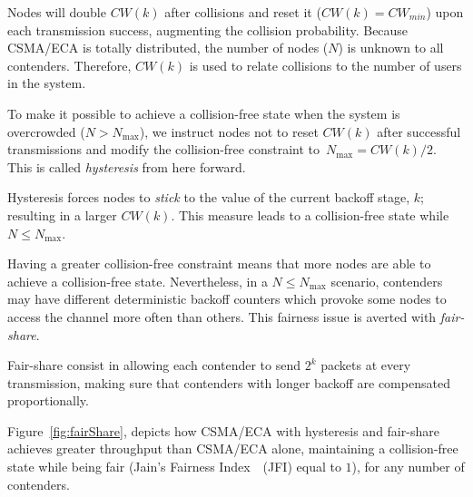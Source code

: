 Nodes will double $CW(k)$ after collisions and reset it ($CW(k)=CW_{min}$) upon each transmission success, augmenting the collision probability. Because CSMA/ECA is totally distributed, the number of nodes ($N$) is unknown to all contenders. Therefore, $CW(k)$ is used to relate collisions to the number of users in the system.


To make it possible to achieve a collision-free state when the system is overcrowded ($N>N_{\max}$), we instruct nodes not to reset $CW(k)$ after successful transmissions and modify the collision-free constraint to~$N_{\max}=CW(k)/2$. This is called \emph{hysteresis} from here forward.

Hysteresis forces nodes to \emph{stick} to the value of the current backoff stage, $k$; resulting in a larger $CW(k)$. This measure leads to a collision-free state while $N\leq N_{\max}$.

Having a greater collision-free constraint means that more nodes are able to achieve a collision-free state. Nevertheless, in a $N\leq N_{\max}$ scenario, contenders may have different deterministic backoff counters which provoke some nodes to access the channel more often than others. This fairness issue is averted with \emph{fair-share}.

Fair-share consist in allowing each contender to send $2^{k}$ packets at every transmission, making sure that contenders with longer backoff are compensated proportionally.

Figure~\ref{fig:fairShare}, depicts how CSMA/ECA with hysteresis and fair-share achieves greater throughput than CSMA/ECA alone, maintaining a collision-free state while being fair (Jain's Fairness Index~\cite{JFI}~(JFI) equal to $1$), for any number of contenders.

